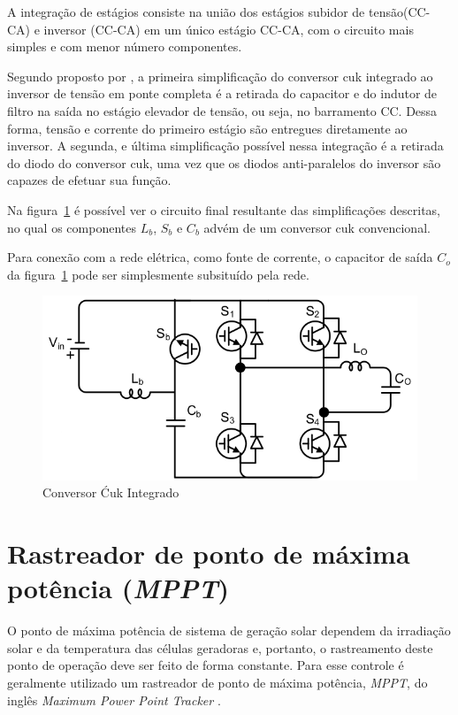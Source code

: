 \documentclass[
	12pt,				%
	openright,			%
	onseside,
	a4paper,			%
	english,			%
	french,				%
	spanish,			%
	brazil,				%
	]{abntex2}
\begin{document}
A integração de estágios consiste na união dos estágios subidor de tensão(CC-CA) e inversor (CC-CA) em um único estágio CC-CA, com o circuito mais simples e com menor número componentes. 

Segundo proposto por , a primeira simplificação do conversor cuk integrado ao inversor de tensão em ponte completa é a retirada do capacitor e do indutor de filtro na saída no estágio elevador de tensão, ou seja, no barramento CC. Dessa forma, tensão e corrente do primeiro estágio são entregues diretamente ao inversor. A segunda, e última simplificação possível nessa integração é a retirada do diodo do conversor cuk, uma vez que os diodos anti-paralelos do inversor são capazes de efetuar sua função.

Na figura~\ref{fig:integ_cuk_circ} é possível ver o circuito final resultante das simplificações descritas, no qual os componentes $L_b$, $S_b$ e $C_b$ advém de um conversor cuk convencional. 

Para conexão com a rede elétrica, como fonte de corrente, o capacitor de saída $C_o$ da figura~\ref{fig:integ_cuk_circ} pode ser simplesmente subsituído pela rede\cite{LUIGI_int_top}. 

\begin{figure}[htbp]
	\begin{center}
		\includegraphics[width=0.55 \linewidth]{integ_cuk_circ}
		\caption{Conversor Ćuk Integrado \cite{LUIGI_int_top}}
		\label{fig:integ_cuk_circ}
	\end{center}
\end{figure}

\section{Rastreador de ponto de máxima potência (\textit{MPPT})}

O ponto de máxima potência de sistema de geração solar dependem da irradiação solar e da temperatura das células geradoras e, portanto, o rastreamento deste ponto de operação deve ser feito de forma constante. Para esse controle é geralmente utilizado um rastreador de ponto de máxima potência, \emph{MPPT}, do inglês \textit{Maximum Power Point Tracker} \cite{Talha_MPPT}. 
\end{document}
